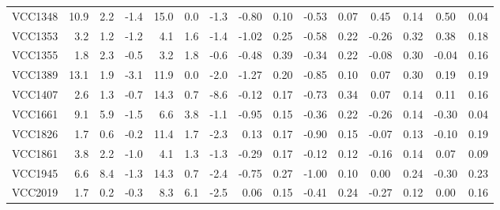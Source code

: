 \begin{tabular}{lrrrrrrrrrrcccc}
VCC1348 & 10.9& 2.2 & -1.4  & 15.0& 0.0 & -1.3  & -0.80 & 0.10 & -0.53 & 0.07 &  0.45 & 0.14 & 0.50 & 0.04 \\
VCC1353 & 3.2 & 1.2 & -1.2  & 4.1 & 1.6 & -1.4  & -1.02 & 0.25 & -0.58 & 0.22 &  -0.26 & 0.32 & 0.38 & 0.18 \\
VCC1355 & 1.8 & 2.3 & -0.5  & 3.2 & 1.8 & -0.6  & -0.48 & 0.39 & -0.34 & 0.22 &  -0.08 & 0.30 & -0.04 & 0.16 \\
VCC1389 & 13.1& 1.9 & -3.1  & 11.9& 0.0 & -2.0  & -1.27 & 0.20 & -0.85 & 0.10 &  0.07 & 0.30 & 0.19 & 0.19 \\
VCC1407 & 2.6 & 1.3 & -0.7  & 14.3& 0.7 & -8.6  & -0.12 & 0.17 & -0.73 & 0.34 &  0.07 & 0.14 & 0.11 & 0.16 \\
VCC1661 & 9.1 & 5.9 & -1.5  & 6.6 & 3.8 & -1.1  & -0.95 & 0.15 & -0.36 & 0.22 &  -0.26 & 0.14 & -0.30 & 0.04 \\
VCC1826 & 1.7 & 0.6 & -0.2  & 11.4& 1.7 & -2.3  &  0.13 & 0.17 & -0.90 & 0.15 &  -0.07 & 0.13 & -0.10 & 0.19 \\
VCC1861 & 3.8 & 2.2 & -1.0  & 4.1 & 1.3 & -1.3  & -0.29 & 0.17 & -0.12 & 0.12 &  -0.16 & 0.14 & 0.07 & 0.09 \\
VCC1945 & 6.6 & 8.4 & -1.3  & 14.3& 0.7 & -2.4  & -0.75 & 0.27 & -1.00 & 0.10 &  0.00 & 0.24 & -0.30 & 0.23 \\
VCC2019 & 1.7 & 0.2 & -0.3  & 8.3 & 6.1 & -2.5  & 0.06 & 0.15 & -0.41 & 0.24 &  -0.27 & 0.12 & 0.00 & 0.16 \\
\end{tabular}

